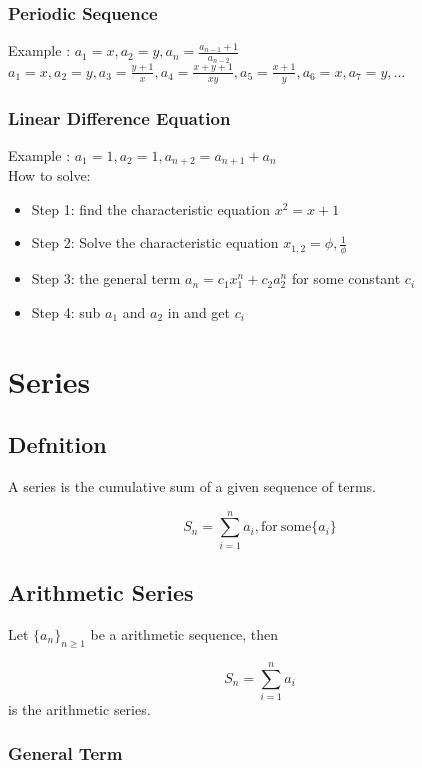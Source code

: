 \documentclass{article}
\begin{document}
\subsubsection{Periodic Sequence}

Example : $a_1=x,a_2=y, a_n=\frac{a_{n-1}+1}{a_{n-2}}$
\\

$a_1=x,a_2=y,a_3=\frac{y+1}{x}, a_4=\frac{x+y+1}{xy}, a_5 = \frac{x+1}{y}, a_6=x, a_7=y, \dots$

\subsubsection{Linear Difference Equation}

Example : $a_1=1, a_2=1, a_{n+2}=a_{n+1}+a_{n} $
\\
How to solve:
\begin{itemize}
    \item Step 1: find the characteristic equation $x^2=x+1$
    \item Step 2: Solve the characteristic equation $x_{1,2}=\phi,\frac{1}{\phi}$
    \item Step 3: the general term $a_n = c_1 x_1^n+ c_2 a_2^n$ for some constant $c_i$
    \item Step 4: sub $a_1$ and $a_2$ in and get $c_i$
\end{itemize}

\section{Series}

\subsection{Defnition}

A series is the cumulative sum of a given sequence of terms.

$$S_n=\sum_{i=1}^{n}a_i \mathrm{,for \ some} \{a_i\}$$ 

\subsection{Arithmetic Series}

Let $\{a_n\}_{n\ge1}$ be a arithmetic sequence, then 

$$S_n=\sum_{i=1}^{n}a_i$$ 
is the arithmetic series.

\subsubsection{General Term}
\end{document}
